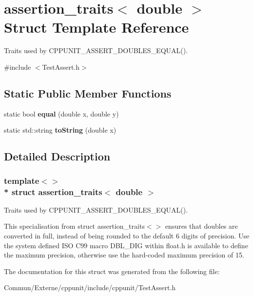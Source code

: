 \hypertarget{structassertion__traits_3_01double_01_4}{}\section{assertion\+\_\+traits$<$ double $>$ Struct Template Reference}
\label{structassertion__traits_3_01double_01_4}


Traits used by C\+P\+P\+U\+N\+I\+T\+\_\+\+A\+S\+S\+E\+R\+T\+\_\+\+D\+O\+U\+B\+L\+E\+S\+\_\+\+E\+Q\+U\+A\+L().  




{\ttfamily \#include $<$Test\+Assert.\+h$>$}

\subsection*{Static Public Member Functions}
\begin{DoxyCompactItemize}
\item 
static bool {\bfseries equal} (double x, double y)\hypertarget{structassertion__traits_3_01double_01_4_ac0d9d71ec0f239664b88188e481c0598}{}\label{structassertion__traits_3_01double_01_4_ac0d9d71ec0f239664b88188e481c0598}

\item 
static std\+::string {\bfseries to\+String} (double x)\hypertarget{structassertion__traits_3_01double_01_4_a6bc37874eb60d30e0b50d4c127ab34df}{}\label{structassertion__traits_3_01double_01_4_a6bc37874eb60d30e0b50d4c127ab34df}

\end{DoxyCompactItemize}


\subsection{Detailed Description}
\subsubsection*{template$<$$>$\\*
struct assertion\+\_\+traits$<$ double $>$}

Traits used by C\+P\+P\+U\+N\+I\+T\+\_\+\+A\+S\+S\+E\+R\+T\+\_\+\+D\+O\+U\+B\+L\+E\+S\+\_\+\+E\+Q\+U\+A\+L(). 

This specialisation from {\ttfamily struct} {\ttfamily assertion\+\_\+traits$<$$>$} ensures that doubles are converted in full, instead of being rounded to the default 6 digits of precision. Use the system defined I\+SO C99 macro D\+B\+L\+\_\+\+D\+IG within float.\+h is available to define the maximum precision, otherwise use the hard-\/coded maximum precision of 15. 

The documentation for this struct was generated from the following file\+:\begin{DoxyCompactItemize}
\item 
Commun/\+Externe/cppunit/include/cppunit/Test\+Assert.\+h\end{DoxyCompactItemize}
